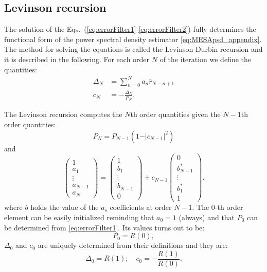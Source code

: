 \documentclass{aa}
\begin{document}
\begin{appendix}
\subsection{Levinson recursion} \label{sec:LevinsonRecursion}
The solution of the Eqs.~(\ref{eq:errorFilter1}-\ref{eq:errorFilter2}) fully determines the functional form of the power spectral density estimator \eqref{eq:MESApsd_appendix}.
The method for solving the equations is called the Levinson-Durbin recursion \citep{doi:10.1002/sapm1946251261} and it is described in the following.
For each order $N$ of the iteration we define the quantities:
\begin{align}
\Delta_N &= \sum_{n = 0}^{N} a_n \bar{r}_{N - n + 1} \\ 
c_N &= - \frac{\Delta_N}{P_N},
\end{align}

The Levinson recursion computes the $N$th order quantities given the $N-1$th order quantities: 
\begin{equation} \label{eq:Levinson1}
P_N = P_{N -1}\left(1 - \vert c_{N - 1} \vert ^2\right)
\end{equation}
and 
\begin{equation} \label{eq:Levinson2}
\begin{pmatrix}
1 \\ a_1 \\ \vdots \\ a_{N - 1} \\ a_N
\end{pmatrix}
= 
\begin{pmatrix}
1 \\ b_1 \\ \vdots \\ b_{N -1} \\ 0
\end{pmatrix}
+ c_{N-1}
\begin{pmatrix}
0 \\ b_{N -1}^* \\ \vdots \\ b^*_1 \\ 1
\end{pmatrix}. 
\end{equation}
where $b$ holds the value of the $a_s$ coefficients at order $N-1$. 
The 0-th order element can be easily initialized reminding that $a_0 = 1$ (always) and that $P_0$ can be determined from \eqref{eq:errorFilter1}.
Its values turns out to be: 
\begin{equation}
P_0 = R(0),
\end{equation}
$\Delta_0$ and $c_0$ are uniquely determined from their definitions and they are:
\begin{equation}
\Delta_0 = R(1); \quad c_0 = -\frac{R(1)}{R(0)}. 
\end{equation}


\end{appendix}
\end{document}
